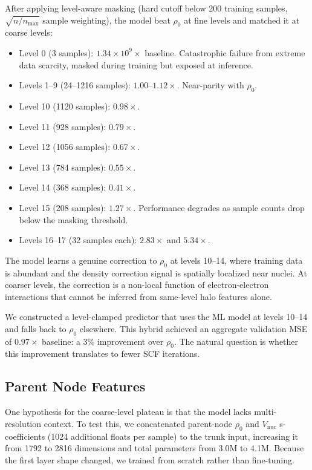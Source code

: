 After applying level-aware masking (hard
cutoff below 200 training samples, $\sqrt{n/n_\text{max}}$ sample
weighting), the model beat $\rho_0$ at fine levels and matched it at
coarse levels:
%
\begin{itemize}
  \item Level 0 (3 samples): $1.34 \times 10^{9}\times$ baseline.
        Catastrophic failure from extreme data scarcity, masked during
        training but exposed at inference.
  \item Levels 1--9 (24--1216 samples): $1.00$--$1.12\times$.
        Near-parity with $\rho_0$.
  \item Level 10 (1120 samples): $0.98\times$.
  \item Level 11 (928 samples): $0.79\times$.
  \item Level 12 (1056 samples): $0.67\times$.
  \item Level 13 (784 samples): $0.55\times$.
  \item Level 14 (368 samples): $0.41\times$.
  \item Level 15 (208 samples): $1.27\times$.
        Performance degrades as sample counts drop below the masking
        threshold.
  \item Levels 16--17 (32 samples each): $2.83\times$ and $5.34\times$.
\end{itemize}
%
The model learns a genuine correction to $\rho_0$ at levels 10--14,
where training data is abundant and the density correction signal is
spatially localized near nuclei. At coarser levels, the correction
is a non-local function of electron-electron interactions that cannot
be inferred from same-level halo features alone.

We constructed a level-clamped predictor that uses the ML model at
levels 10--14 and falls back to $\rho_0$ elsewhere. This hybrid
achieved an aggregate validation MSE of $0.97\times$ baseline: a 3\%
improvement over $\rho_0$. The natural question is whether this
improvement translates to fewer SCF iterations.

\subsection{Parent Node Features}
\label{sec:parent_features}

One hypothesis for the coarse-level plateau is that the model lacks
multi-resolution context. To test this, we concatenated parent-node
$\rho_0$ and $V_\text{nuc}$ s-coefficients (1024 additional floats per
sample) to the trunk input, increasing it from 1792 to 2816 dimensions
and total parameters from 3.0M to 4.1M. Because the first layer shape
changed, we trained from scratch rather than fine-tuning.

